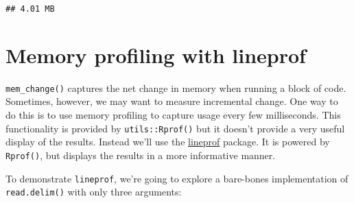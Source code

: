 \begin{verbatim}
## 4.01 MB
\end{verbatim}

\hypertarget{memory-profiling}{%
\section{Memory profiling with lineprof}\label{memory-profiling}}

\texttt{mem\_change()} captures the net change in memory when running a
block of code. Sometimes, however, we may want to measure incremental
change. One way to do this is to use memory profiling to capture usage
every few milliseconds. This functionality is provided by
\texttt{utils::Rprof()} but it doesn't provide a very useful display of
the results. Instead we'll use the
\href{https://github.com/hadley/lineprof}{lineprof} package. It is
powered by \texttt{Rprof()}, but displays the results in a more
informative manner. 

To demonstrate \texttt{lineprof}, we're going to explore a bare-bones
implementation of \texttt{read.delim()} with only three arguments:

